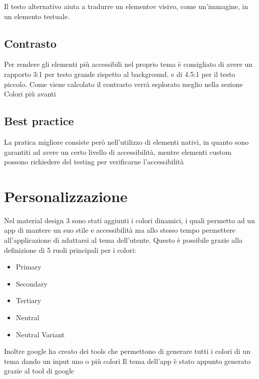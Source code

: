\documentclass[12pt, a4paper]{report}
\begin{document}
			Il testo alternativo aiuta a tradurre un elementov visivo, come un'immagine, in un elemento testuale.
		\subsection{Contrasto}
			Per rendere gli elementi più accessibili nel proprio tema è consigliato di avere un rapporto 3:1 per testo grande rispetto al background, e di 4.5:1 per il testo piccolo. Come viene calcolato il contrasto verrà esplorato meglio nella sezione Colori più avanti

		\subsection{Best practice}
			La pratica migliore consiste però nell'utilizzo di elementi nativi, in quanto sono garantiti ad avere un certo livello di accessibilità, mentre elementi custom possono richiedere del testing per verificarne l'accessibilità
	\section{Personalizzazione}
		Nel material design 3 sono stati aggiunti i colori dinamici, i quali permetto ad un app di mantere un suo stile e accessibilità ma allo stesso tempo permettere all'applicazione di adattarsi al tema dell'utente.
		Questo è possibile grazie alla definizione di 5 ruoli principali per i colori:
		\begin{itemize}
			\item Primary
			\item Secondary
			\item Tertiary
			\item Neutral
			\item Neutral Variant
		\end{itemize}
		Inoltre google ha creato dei tools che permettono di generare tutti i colori di un tema dando un input uno o più colori
		Il tema dell'app è stato appunto generato grazie al tool di google
		



\printbibliography
\end{document}
